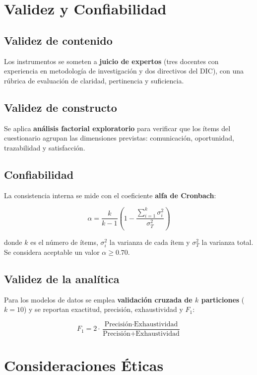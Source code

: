 \section{Validez y Confiabilidad}

\subsection{Validez de contenido}
Los instrumentos se someten a \textbf{juicio de expertos} (tres docentes con
experiencia en metodología de investigación y dos directivos del \ac{DIC}), con
una rúbrica de evaluación de claridad, pertinencia y suficiencia.

\subsection{Validez de constructo}
Se aplica \textbf{análisis factorial exploratorio} para verificar que los ítems
del cuestionario agrupan las dimensiones previstas: comunicación, oportunidad,
trazabilidad y satisfacción.

\subsection{Confiabilidad}
La consistencia interna se mide con el coeficiente \textbf{alfa de Cronbach}:

\begin{equation}
\alpha = \frac{k}{k-1}\left(1 - \frac{\sum_{i=1}^{k} \sigma^{2}_{i}}{\sigma^{2}_{T}}\right)
\label{eq:cronbach}
\end{equation}

donde $k$ es el número de ítems, $\sigma^{2}_{i}$ la varianza de cada ítem y
$\sigma^{2}_{T}$ la varianza total. Se considera aceptable un valor
$\alpha \geq 0.70$.

\subsection{Validez de la analítica}
Para los modelos de datos se emplea \textbf{validación cruzada de $k$ particiones}
($k=10$) y se reportan exactitud, precisión, exhaustividad y $F_1$:

\begin{equation}
F_1 = 2 \cdot \frac{\text{Precisión} \cdot \text{Exhaustividad}}
{\text{Precisión} + \text{Exhaustividad}}
\label{eq:f1}
\end{equation}

\section{Consideraciones Éticas}

